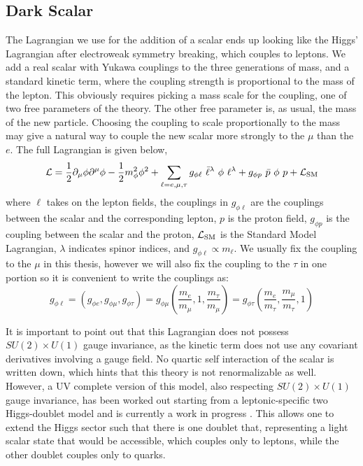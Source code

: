\subsection{Dark Scalar}
The Lagrangian we use for the addition of a scalar ends up looking like the Higgs' Lagrangian after electroweak symmetry breaking, which couples to leptons.
We add a real scalar with Yukawa couplings to the three generations of mass, and a standard kinetic term, where the coupling strength is proportional to the mass of the lepton.
This obviously requires picking a mass scale for the coupling, one of two free parameters of the theory.
The other free parameter is, as usual, the mass of the new particle.
Choosing the coupling to scale proportionally to the mass may give a natural way to couple the new scalar more strongly to the $\mu$ than the $e$.
The full Lagrangian is given below,
\begin{equation}
\label{eqn:scalar_lagrangian}
\operatorname{\mathcal{L}} = \frac{1}{2}\partial_\mu \phi \partial^\mu \phi - \frac{1}{2} m_\phi^2 \phi^2 + \sum_{\ell=e,\mu,\tau} g_{\phi \ell}~\bar{\ell}^\lambda~\phi~\ell^\lambda + g_{\phi p}~\bar{p}~\phi~p + \operatorname{\mathcal{L}}_{\textrm{SM}}
\end{equation}
where $\ell$ takes on the lepton fields, the couplings in $g_{\phi \ell}$ are the couplings between the scalar and the corresponding lepton, $p$ is the proton field, $g_{\phi p}$ is the coupling between the scalar and the proton, $\operatorname{\mathcal{L}}_\textrm{SM}$ is the Standard Model Lagrangian, $\lambda$ indicates spinor indices, and $g_{\phi \ell} \propto m_\ell$.
We usually fix the coupling to the $\mu$ in this thesis, however we will also fix the coupling to the $\tau$ in one portion so it is convenient to write the couplings as:
\begin{equation*}
\label{eqn:coupling_mass}
g_{\phi \ell} = \left(g_{\phi e}, g_{\phi \mu}, g_{\phi \tau}\right) = g_{\phi \mu} \left( \frac{m_e}{m_\mu}, 1, \frac{m_\tau}{m_\mu} \right) = g_{\phi \tau} \left( \frac{m_e}{m_\tau}, \frac{m_\mu}{m_\tau}, 1 \right)
\end{equation*}

It is important to point out that this Lagrangian does not possess $SU(2) \times U(1)$ gauge invariance, as the kinetic term does not use any covariant derivatives involving a gauge field.
No quartic self interaction of the scalar is written down, which hints that this theory is not renormalizable as well.
However, a UV complete version of this model, also respecting $SU(2) \times U(1)$ gauge invariance, has been worked out starting from a leptonic-specific two Higgs-doublet model and is currently a work in progress \cite{Batell:2015unpub}.
This allows one to extend the Higgs sector such that there is one doublet that, representing a light scalar state that would be accessible, which couples only to leptons, while the other doublet couples only to quarks.


